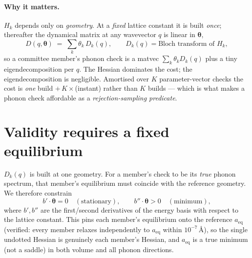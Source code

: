 \documentclass[11pt]{article}
\newcommand{\bt}{\boldsymbol{\theta}}
\begin{document}
\paragraph{Why it matters.} $H_k$ depends only on \emph{geometry}. At a
\emph{fixed} lattice constant it is built \emph{once}; thereafter the dynamical
matrix at any wavevector $q$ is linear in $\bt$,
\begin{equation}
  D(q,\bt) \;=\; \sum_k \theta_k\, D_k(q),
  \qquad D_k(q) = \text{Bloch transform of } H_k,
\end{equation}
so a committee member's phonon check is a matvec $\sum_k\theta_k D_k(q)$ plus a
tiny eigendecomposition per $q$. The Hessian dominates the cost; the
eigendecomposition is negligible. Amortised over $K$ parameter-vector checks the
cost is \emph{one} build $+\,K\times$(instant) rather than $K$ builds --- which
is what makes a phonon check affordable as a \emph{rejection-sampling
predicate}.

\section{Validity requires a fixed equilibrium}
$D_k(q)$ is built at one geometry. For a member's check to be its \emph{true}
phonon spectrum, that member's equilibrium must coincide with the reference
geometry. We therefore constrain
\begin{equation}
  b'\!\cdot\bt = 0 \quad(\text{stationary}), \qquad
  b''\!\cdot\bt > 0 \quad(\text{minimum}),
\end{equation}
where $b',b''$ are the first/second derivatives of the energy basis with respect
to the lattice constant. This pins each member's equilibrium onto the reference
$a_{\mathrm{eq}}$ (verified: every member relaxes independently to
$a_{\mathrm{eq}}$ within $10^{-7}$\,\AA), so the single undotted Hessian is
genuinely each member's Hessian, and $a_{\mathrm{eq}}$ is a true minimum (not a
saddle) in both volume and all phonon directions.
\end{document}
